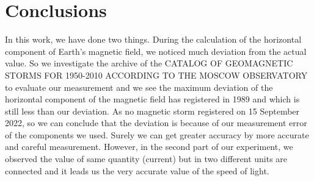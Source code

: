 \documentclass[a4paper, 12pt]{article}%
\begin{document}
\section{Conclusions}
In this work, we have done two things. During the calculation of the horizontal component of Earth's magnetic field, we noticed much deviation from the actual value. So we investigate the archive of the CATALOG OF GEOMAGNETIC STORMS FOR 1950-2010 ACCORDING TO THE MOSCOW OBSERVATORY to evaluate our measurement and we see the maximum deviation of the horizontal component of the magnetic field has registered in 1989 and which is still less than our deviation. As no magnetic storm registered on 15 September 2022, so we can conclude that the deviation is because of our  measurement error of the components we used. Surely we can get greater accuracy by more accurate and careful measurement. However, in the second part of our experiment, we observed the value of same quantity (current) but in two different units are connected and it leads us the very accurate value of the speed of light.
\end{document}
